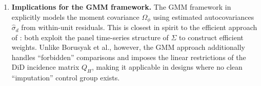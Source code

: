 \documentclass[12pt]{article}
\begin{document}
\begin{enumerate}
  \item \textbf{Implications for the GMM framework.}
        The GMM framework in \citet{arora2026gmm} explicitly models the
        moment covariance $\Omega_\phi$ using estimated autocovariances
        $\hat{\sigma}_d$ from within-unit residuals.
        This is closest in spirit to the efficient approach of
        \citet{borusyak2024revisiting}: both exploit the panel time-series
        structure of $\Sigma$ to construct efficient weights.
        Unlike Borusyak et al., however, the GMM approach additionally
        handles ``forbidden'' comparisons and imposes the linear restrictions
        of the DiD incidence matrix $Q_H$, making it applicable in designs
        where no clean ``imputation'' control group exists.

\end{enumerate}



\end{document}
